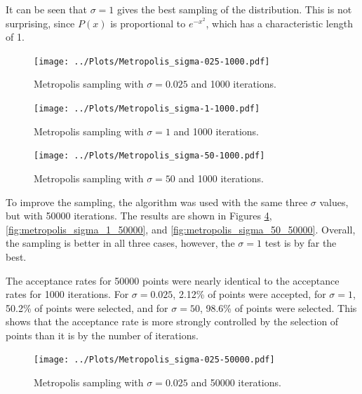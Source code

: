 \documentclass[twocolumn]{myarticle}
\begin{document}
It can be seen that $ \sigma = 1 $ gives the best sampling of the distribution.
This is not surprising, since $ P(x) $ is proportional to $ e^{-x^2} $, which has a characteristic length of 1.

\begin{figure}[ht!]
    \begin{center}
    \texttt{[image: ../Plots/Metropolis\_sigma-025-1000.pdf]}
    \caption{%
    Metropolis sampling with $ \sigma = 0.025 $ and 1000 iterations.
    }
    \label{fig:metropolis_sigma_025_1000}
    \end{center}
\end{figure}

\begin{figure}[ht!]
    \begin{center}
    \texttt{[image: ../Plots/Metropolis\_sigma-1-1000.pdf]}
    \caption{%
    Metropolis sampling with $ \sigma = 1 $ and 1000 iterations.
    }
    \label{fig:metropolis_sigma_1_1000}
    \end{center}
\end{figure}

\begin{figure}[ht!]
    \begin{center}
    \texttt{[image: ../Plots/Metropolis\_sigma-50-1000.pdf]}
    \caption{%
    Metropolis sampling with $ \sigma = 50 $ and 1000 iterations.
    }
    \label{fig:metropolis_sigma_50_1000}
    \end{center}
\end{figure}

To improve the sampling, the algorithm was used with the same three $ \sigma $ values, but with 50000 iterations.
The results are shown in Figures \ref{fig:metropolis_sigma_025_50000}, \ref{fig:metropolis_sigma_1_50000}, and \ref{fig:metropolis_sigma_50_50000}.
Overall, the sampling is better in all three cases, however, the $ \sigma = 1 $ test is by far the best.

The acceptance rates for 50000 points were nearly identical to the acceptance rates for 1000 iterations.
For $ \sigma = 0.025 $, 2.12\% of points were accepted, for $ \sigma = 1 $, 50.2\% of points were selected, and for $ \sigma = 50 $, 98.6\% of points were selected.
This shows that the acceptance rate is more strongly controlled by the selection of points than it is by the number of iterations.

\begin{figure}[ht!]
    \begin{center}
    \texttt{[image: ../Plots/Metropolis\_sigma-025-50000.pdf]}
    \caption{%
    Metropolis sampling with $ \sigma = 0.025 $ and 50000 iterations.
    }
    \label{fig:metropolis_sigma_025_50000}
    \end{center}
\end{figure}
\end{document}
